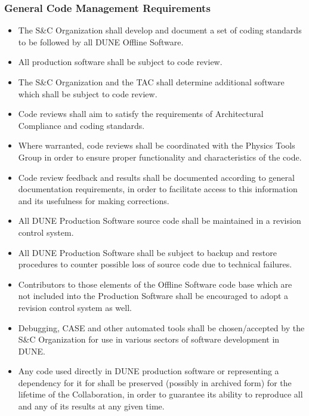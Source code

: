 \subsubsection{General Code Management Requirements}
\label{sec:lbnecodeman}
\begin{itemize}
\item The S\&C Organization shall develop and document a set of coding standards to be followed by all DUNE Offline Software.

\item All production software shall be subject to code review.


\item The S\&C Organization and the TAC shall determine additional software which shall be subject to code review.

\item Code reviews shall aim to satisfy the requirements of Architectural Compliance and coding standards.

\item Where warranted, code reviews shall be coordinated with the Physics Tools Group in order to ensure proper functionality and characteristics of the code.


\item Code review feedback and results shall be documented according to general documentation requirements, in order to facilitate access to this information and its usefulness for making corrections.

\item All DUNE Production Software source code shall be maintained in a revision control system.

\item All DUNE Production Software shall be subject to backup and restore procedures to counter possible loss of source code due to technical failures.

\item Contributors to those elements of the Offline Software code base which are not included into the Production Software shall be encouraged to adopt a revision control system as well.

\item Debugging, CASE and other automated tools shall be chosen/accepted by the S\&C Organization for use in various sectors of software development in DUNE.

\item Any code used directly in DUNE production software or representing a dependency for it for shall be preserved (possibly in archived form) for the lifetime of the Collaboration, in order to guarantee its ability to reproduce all and any of its results at any given time.



\end{itemize}
